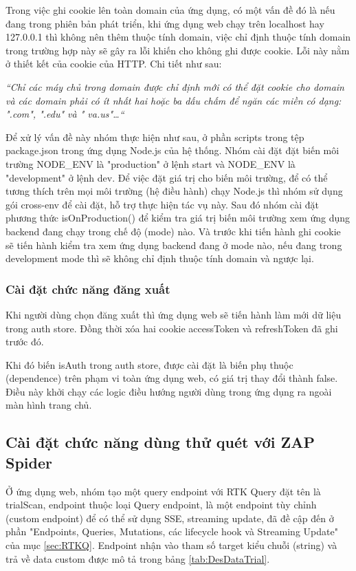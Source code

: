 Trong việc ghi cookie lên toàn domain của ứng dụng, có một vấn đề đó là nếu đang trong phiên bản phát triển, khi ứng dụng web chạy trên localhost hay 127.0.0.1 thì không nên thêm thuộc tính domain, việc chỉ định thuộc tính domain trong trường hợp này sẽ gây ra lỗi khiến cho không ghi được cookie. Lỗi này nằm ở thiết kết của cookie của HTTP. Chi tiết như sau:

\textit{“Chỉ các máy chủ trong domain được chỉ định mới có thể đặt cookie cho domain và các domain phải có ít nhất hai hoặc ba dấu chấm để ngăn các miền có dạng: ".com", ".edu" và " va.us"…“} \cite{chap4bib4}

Để xử lý vấn đề này nhóm thực hiện như sau, ở phần scripts trong tệp package.json trong ứng dụng Node.js của hệ thống.
Nhóm cài đặt đặt biến môi trường NODE\_ENV là "production" ở lệnh start và NODE\_ENV là "development" ở lệnh dev.
Để việc đặt giá trị cho biến môi trường, để có thể tương thích trên mọi môi trường (hệ điều hành) chạy Node.js thì nhóm sử dụng gói cross-env để cài đặt, hỗ trợ thực hiện tác vụ này. Sau đó nhóm cài đặt phương thức isOnProduction() để kiểm tra giá trị biến môi trường xem ứng dụng backend đang chạy trong chế độ (mode) nào. Và trước khi tiến hành ghi cookie sẽ tiến hành kiểm tra xem ứng dụng backend đang ở mode nào, nếu đang trong development mode thì sẽ không chỉ định thuộc tính domain và ngược lại.

\subsubsection{Cài đặt chức  năng đăng xuất}

\tab Khi người dùng chọn đăng xuất thì ứng dụng web sẽ tiến hành làm mới dữ liệu trong auth store. Đồng thời xóa hai cookie accessToken và refreshToken đã ghi trước đó.

Khi đó biến isAuth trong auth store, được cài đặt là biến phụ thuộc (dependence) trên phạm vi toàn ứng dụng web, có giá trị thay đổi thành false. Điều này khởi chạy các logic điều hướng người dùng trong ứng dụng ra ngoài màn hình trang chủ.

\subsection{Cài đặt chức năng dùng thử quét với ZAP Spider} \label{subsec:CaiDatDungThuZapSpider}

\tab Ở ứng dụng web, nhóm tạo một query endpoint với RTK Query đặt tên là trialScan, endpoint thuộc loại Query endpoint, là một endpoint tùy chỉnh (custom endpoint) để có thể sử dụng SSE, streaming update, đã đề cập đến ở phần "Endpoints, Queries, Mutations, các lifecycle hook và Streaming Update" của mục \ref{sec:RTKQ}.
Endpoint nhận vào tham số target kiểu chuỗi (string) và trả về data custom được mô tả trong bảng \ref{tab:DesDataTrial}.

